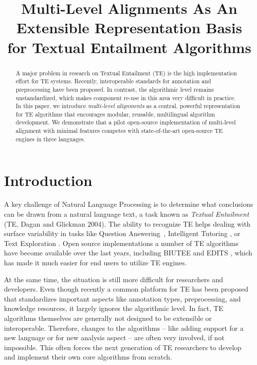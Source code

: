 \documentclass[11pt,letterpaper]{article}
\title{Multi-Level Alignments As An Extensible Representation Basis \\
  for Textual Entailment Algorithms}
\date{}
\begin{document}
\maketitle
\begin{abstract}
  A major problem in research on Textual Entailment (TE) is the high
  implementation effort for TE systems. Recently, interoperable
  standards for annotation and preprocessing have been proposed. In
  contrast, the algorithmic level remains unstandardized, which
  makes component re-use in this area very difficult in
  practice.
%
%
%
  In this paper, we introduce {\em multi-level alignments} as a
  central, powerful representation for TE algorithms that encourages
  modular, reusable, multilingual algorithm development.
  We demonstrate that a pilot open-source implementation of
  multi-level alignment with minimal features competes with
  state-of-the-art open-source TE engines in three languages.
\end{abstract}

\section{Introduction}
A key challenge of Natural Language Processing is to determine what
conclusions can be drawn from a natural language text, a task known as
\textit{Textual Entailment} (TE, Dagan and Glickman
2004).\nocite{dagan04:_probab_textual_entail} The ability to recognize
TE helps dealing with surface variability in tasks like Question
Answering~\cite{harabagiu-hickl:2006:COLACL}, Intelligent Tutoring
\cite{nielsen09:_recog_entail_in_intel_tutor_system}, or Text
Exploration \cite{berant2012learning}. Open source implementations a
number of TE algorithms have become available over the last years,
including BIUTEE \cite{Stern:2012} and EDITS \cite{Kouylekov:2010},
which has made it much easier for end users to utilize TE engines.

At the same time, the situation is still more difficult for
researchers and developers. Even though recently a common platform for
TE has been proposed \cite{EOP-arch} that standardizes important
aspects like annotation types, preprocessing, and knowledge resources,
it largely ignores the algorithmic level. In fact, TE algorithms
themselves are generally not designed to be extensible or
interoperable. Therefore, changes to the algorithms -- like adding
support for a new language or for new analysis aspect -- are often
very involved, if not impossible. This often forces the next
generation of TE researchers to develop and implement their own core
algorithms from scratch.
\end{document}
